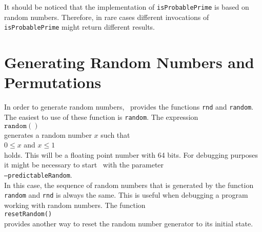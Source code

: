 \begin{enumerate}
      It should be noticed that the implementation of \texttt{isProbablePrime} is
      based on random numbers.  Therefore, in rare cases different invocations of
      \texttt{isProbablePrime} might return different results.  
\end{enumerate}


\section{Generating Random Numbers and Permutations}
In order to generate random numbers, \setlx\ provides the functions \texttt{rnd} and
\texttt{random}.  The easiest to use of these function is \texttt{random}.  The expression
\\[0.2cm]
\hspace*{1.3cm}
$\texttt{random}()$
\\[0.2cm]
generates a random number $x$ such that 
\\[0.2cm]
\hspace*{1.3cm}
$0 \leq x$ \quad and \quad $x \leq 1$
\\[0.2cm]
holds.  This will be a floating point number with 64 bits.  For debugging purposes it might be necessary to start \setlx\ with
the parameter
\\[0.2cm]
\hspace*{1.3cm}
\texttt{--predictableRandom}.
\\[0.2cm]
In this case, the sequence of random numbers that is generated by the function \texttt{random} and
\texttt{rnd} is always the same.  This is useful when debugging a program working with
random numbers.  The function 
\\[0.2cm]
\hspace*{1.3cm}
\texttt{resetRandom()}
\\[0.2cm]
provides another way to reset the random number generator to its initial state.

